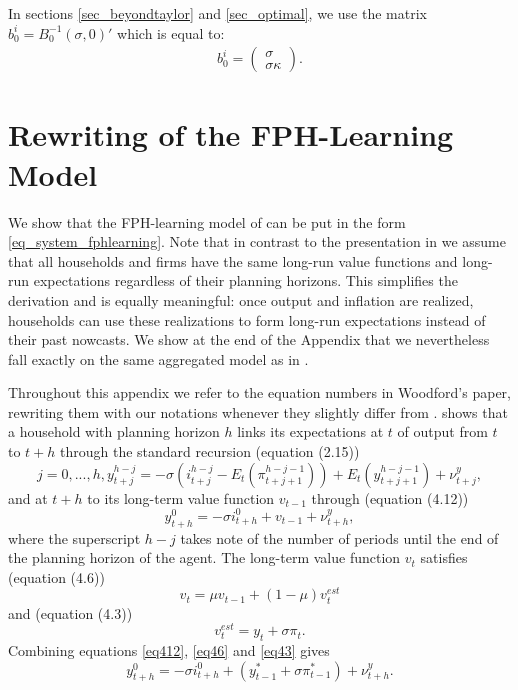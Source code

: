 In sections \ref{sec_beyondtaylor} and \ref{sec_optimal}, we use the matrix $b_0^i = B_0^{-1}(\sigma,0)'$ which is equal to:
\begin{align}
b_0^i = \begin{pmatrix} \sigma  \\ \sigma \kappa \end{pmatrix}.
\end{align}

\section{Rewriting of the FPH-Learning Model}\label{appendix_learningderivation}
We show that the FPH-learning model of \cite{Woodford2019} can be put in the form \eqref{eq_system_fphlearning}. Note that in contrast to the presentation in \cite{Woodford2019} we assume that all households and firms have the same long-run value functions and long-run expectations regardless of their planning horizons. This simplifies the derivation and is equally meaningful: once output and inflation are realized, households can use these realizations to form long-run expectations instead of their past nowcasts. We show at the end of the Appendix that we nevertheless fall exactly on the same aggregated model as in \cite{Woodford2019}.

Throughout this appendix we refer to the equation numbers in Woodford's paper, rewriting them with our notations whenever they slightly differ from \cite{Woodford2019}. \cite{Woodford2019} shows that a household with planning horizon $h$ links its expectations at $t$ of output from $t$ to $t+h$ through the standard recursion (equation (2.15))
\begin{equation}
j=0,...,h, y_{t+j}^{h-j} = -\sigma (i_{t+j}^{h-j}-E_t(\pi_{t+j+1}^{h-j-1})) + E_t(y_{t+j+1}^{h-j-1}) +\nu_{t+j}^y,\label{eq_rec1}
\end{equation}
and at $t+h$ to its long-term value function $v_{t-1}$ through (equation (4.12))
\begin{equation}
y_{t+h}^0 = -\sigma i_{t+h}^0 + v_{t-1} +\nu_{t+h}^y,\label{eq412}
\end{equation}
where the superscript $h-j$ takes note of the number of periods until the end of the planning horizon of the agent.
The long-term value function $v_t$ satisfies (equation (4.6))
\begin{equation}
v_t = \mu v_{t-1} + (1-\mu) v_t^{est}\label{eq46}
\end{equation}
and (equation (4.3))
\begin{equation}
v_t^{est} = y_t + \sigma \pi_t.\label{eq43}
\end{equation}
Combining equations \eqref{eq412}, \eqref{eq46} and \eqref{eq43} gives
\begin{equation}
y_{t+h}^0 = -\sigma i_{t+h}^0 + (y_{t-1}^{*}+\sigma \pi_{t-1}^{*}) + \nu_{t+h}^y.\label{eq_learning1}
\end{equation}

